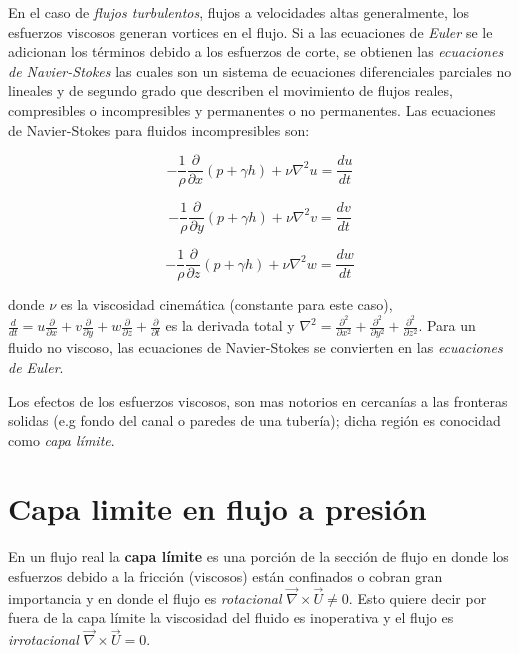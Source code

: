 \documentclass[11pt, oneside]{article}
\begin{document}
En el caso de \emph{flujos turbulentos}, flujos a velocidades altas generalmente, los esfuerzos viscosos generan vortices en el flujo. Si a las ecuaciones de \emph{Euler} se le adicionan los t\'erminos debido a los esfuerzos de corte, se obtienen las \emph{ecuaciones de Navier-Stokes} las cuales son un sistema de ecuaciones diferenciales parciales no lineales y de segundo grado que describen el movimiento de flujos reales, compresibles o incompresibles y permanentes o no permanentes. Las ecuaciones de Navier-Stokes para fluidos incompresibles son:

\begin{equation}
-\frac{1}{\rho}\frac{\partial}{\partial x}(p + \gamma h) + \nu \nabla^2 u = \frac{du}{dt}
\label{nast1}
\end{equation}

\begin{equation}
-\frac{1}{\rho}\frac{\partial}{\partial y}(p + \gamma h) + \nu \nabla^2 v = \frac{dv}{dt}
\label{nast2}
\end{equation}

\begin{equation}
-\frac{1}{\rho}\frac{\partial}{\partial z}(p + \gamma h) + \nu \nabla^2 w = \frac{dw}{dt}
\label{nast3}
\end{equation}

donde $\nu$ es la viscosidad cinem\'atica (constante para este caso), $\frac{d}{dt}=u\frac{\partial}{\partial x}+v\frac{\partial}{\partial y}+w\frac{\partial}{\partial z}+\frac{\partial}{\partial t}$ es la derivada total y $\nabla^2 = \frac{\partial^2}{\partial x^2} + \frac{\partial^2}{\partial y^2} + \frac{\partial^2}{\partial z^2}$. Para un fluido no viscoso, las ecuaciones de Navier-Stokes se convierten en las \emph{ecuaciones de Euler}.


Los efectos de los esfuerzos viscosos, son mas notorios en cercan\'ias a las fronteras solidas (e.g fondo del canal o paredes de una tuber\'ia); dicha regi\'on es conocidad como \emph{capa l\'imite}. 


\section{Capa limite en flujo a presi\'on} %
En un flujo real  la \textbf{capa l\'imite} es una porci\'on de la secci\'on de flujo en donde los esfuerzos debido a la fricci\'on (viscosos) est\'an confinados o cobran gran importancia y en donde el flujo es \emph{rotacional} $\vec{\nabla} \times  \vec{U} \neq 0$. Esto quiere decir por fuera de la capa l\'imite la viscosidad del fluido es inoperativa y el flujo es \emph{irrotacional}  $\vec{\nabla} \times  \vec{U} = 0$.
\end{document}
